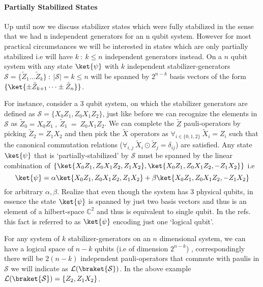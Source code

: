 \documentclass[
]{article}
\begin{document}
\hypertarget{partially-stabilized-states}{%
\paragraph{Partially Stabilized
States}\label{partially-stabilized-states}}

Up until now we discuss stabilizer states which were fully stabilized in
the sense that we had n independent generators for an n qubit system.
However for most practical circumstances we will be interested in states
which are only partially stabilized i.e will have \(k \: :\:k\leq n\)
independent generators instead. On a \(n\) qubit system with any state
\(\ket{\psi}\) with \(k\) independent stabilizer-generators
\(\mathcal{S} =\{\tilde{Z}_{1}\dots \tilde{Z}_{k}\}\::\: |\mathcal{S}|=k \leq n\)
will be spanned by \(2^{n-k}\) basis vectors of the form
\(\{\ket{\pm \tilde{Z}_{k+1} \dots \pm \tilde{Z}_{n}}\}\).

For instance, consider a 3 qubit system, on which the stabilizer
generators are defined as
\(\mathcal{S} = \{X_{0} Z_{1}, Z_{0}X_{1}Z_{2} \}\), just like before we
can recognize the elements in \(\mathcal{S}\) as
\(\tilde{Z}_{0}= X_{0}Z_{1} \:, \: \tilde{Z}_{1} \:= \: Z_{0}X_{1}Z_{2}\).
We can complete the \(\tilde{Z}\) pauli-operators by picking
\(\tilde{Z}_{2}= Z_{1}X_{2}\) and then pick the \(\tilde{X}\) operators
as \(\forall_{i\in \{0,1,2\}} \:\tilde{X}_{i}= Z_{i}\) such that the
canonical commutation relations
(\(\forall_{i,j} \:\tilde{X}_{i}\odot \tilde{Z}_{j} = \delta_{ij}\)) are
satisfied. Any state \(\ket{\psi}\) that is `partially-stabilized' by
\(\mathcal{S}\) must be spanned by the linear combination of
\(\{\ket{X_{0} Z_{1}, Z_{0}X_{1}Z_{2}, Z_{1}X_{2}} , \ket{X_{0} Z_{1}, Z_{0}X_{1}Z_{2}, -Z_{1}X_{2}} \}\)
i.e
\[\ket{\psi} = \alpha \ket{X_{0} Z_{1}, Z_{0}X_{1}Z_{2}, Z_{1}X_{2}} + \beta \ket{X_{0} Z_{1}, Z_{0}X_{1}Z_{2}, -Z_{1}X_{2}}\]for
arbitrary \(\alpha, \beta\). Realize that even though the system has 3
physical qubits, in essence the state \(\ket{\psi}\) is spanned by just
two basis vectors and thus is an element of a hilbert-space
\(\mathbb{C}^2\) and thus is equivalent to single qubit. In the refs.
this fact is referred to as \(\ket{\psi}\) encoding just one `logical
qubit'.

For any system of \(k\) stabilizer-generators on an \(n\) dimensional
system, we can have a logical space of \(n-k\) qubits (i.e of dimension
\(2^{n-k}\)) , correspondingly there will be \(2(n-k)\) independent
pauli-operators that commute with paulis in \(\mathcal{S}\) we will
indicate as \(\mathcal{L}(\braket{\mathcal{S}})\). In the above example
\(\mathcal{L}(\braket{\mathcal{S}})= \{Z_{2}, Z_{1}X_{2}\}\).
\end{document}
